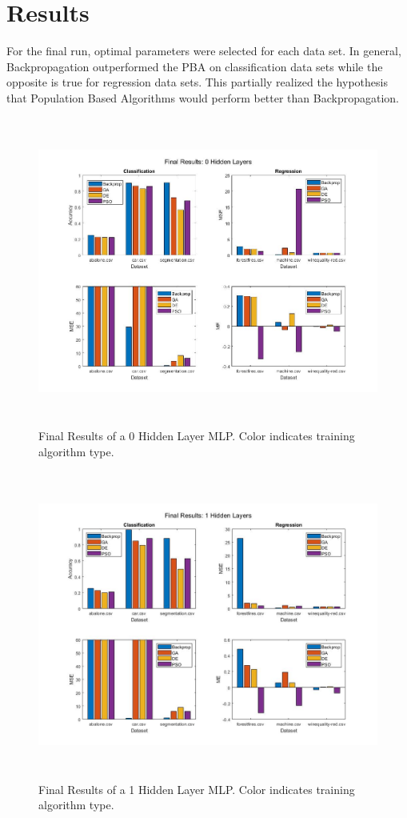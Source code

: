 \documentclass[twoside,11pt]{article}
\begin{document}
\section{Results}

	For the final run, optimal parameters were selected for each data set. In general, Backpropagation outperformed the PBA on classification data sets while the opposite is true for regression data sets. This partially realized the hypothesis that Population Based Algorithms would perform better than Backpropagation.

	\begin{figure}[h]
		\centering
		\includegraphics[height=4in]{FINAL_FIGS/0_hl.jpg}
		\caption{Final Results of a 0 Hidden Layer MLP. Color indicates training algorithm type.}
		\label{0-hl}
	\end{figure}
	
	\begin{figure}[h]
		\centering
		\includegraphics[height=4in]{FINAL_FIGS/1_hl.jpg}
		\caption{Final Results of a 1 Hidden Layer MLP. Color indicates training algorithm type.}
		\label{1-hl}
	\end{figure}
	
\end{document}

